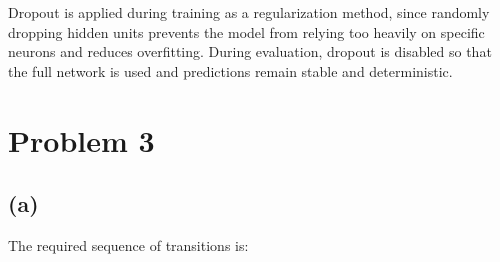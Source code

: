 \documentclass[a4paper,10pt]{article}
\begin{document}
Dropout is applied during training as a regularization method, since randomly dropping hidden units prevents the model from relying too heavily on specific neurons and reduces overfitting. During evaluation, dropout is disabled so that the full network is used and predictions remain stable and deterministic.

\section{Problem 3}\label{problem-3}

\subsection{(a)}\label{a-2}

The required sequence of transitions is:
\end{document}
